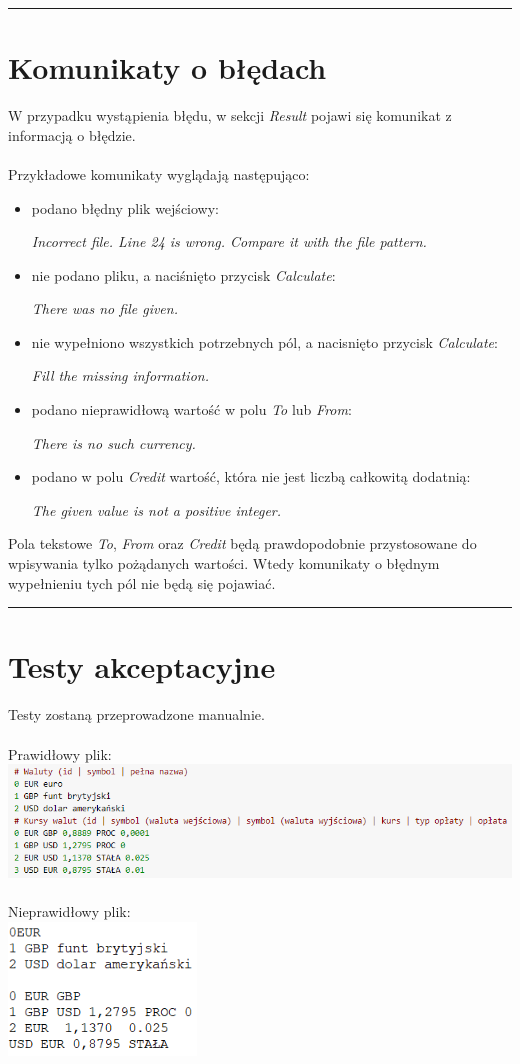 \documentclass[a4paper,11pt]{article}
\newcommand{\linia}{\rule{\linewidth}{0.4mm}}
\begin{document}
\noindent\linia
\section{Komunikaty o błędach}
W przypadku wystąpienia błędu, w sekcji \textit{Result} pojawi się komunikat z informacją o błędzie. 
\\\\
Przykładowe komunikaty wyglądają następująco:
\begin{itemize}
\item podano błędny plik wejściowy:

\textit{Incorrect file. Line 24 is wrong. Compare it with the file pattern.}
\item nie podano pliku, a naciśnięto przycisk \textit{Calculate}:

\textit{There was no file given.}
\item nie wypełniono wszystkich potrzebnych pól, a nacisnięto przycisk \textit{Calculate}:

\textit{Fill the missing information.}
\item podano nieprawidłową wartość w polu \textit{To} lub \textit{From}:

\textit{There is no such currency.}
\item podano w polu \textit{Credit} wartość, która nie jest liczbą całkowitą dodatnią:

\textit{The given value is not a positive integer.}
\end{itemize}
Pola tekstowe \textit{To}, \textit{From} oraz \textit{Credit} będą prawdopodobnie przystosowane do wpisywania tylko pożądanych wartości. Wtedy komunikaty o błędnym wypełnieniu tych pól nie będą się pojawiać.

\noindent\linia
\section{Testy akceptacyjne}
Testy zostaną przeprowadzone manualnie.
\\\\
Prawidłowy plik:
\\
\includegraphics[width= 16cm]{FileFormat}
\\\\
Nieprawidłowy plik:
\\
\includegraphics[width= 5cm]{FaultyFileFormat}
\end{document}
